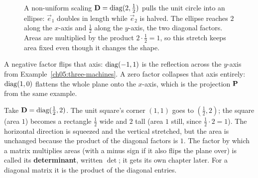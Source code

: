 \begin{figure}[H]
\centering
{}
\caption{A non-uniform scaling $\mathbf{D}=\operatorname{diag}(2,\tfrac12)$ pulls the unit circle
into an ellipse: $\vec{e}_1$ doubles in length while $\vec{e}_2$ is halved. The
ellipse reaches $2$ along the $x$-axis and $\tfrac12$ along the $y$-axis, the two
diagonal factors. Areas are multiplied by
the product $2\cdot\tfrac12 = 1$, so this stretch keeps area fixed even
though it changes the shape.}
\label{ch05:fig-scaling}
\end{figure}

A negative factor flips that axis: $\operatorname{diag}(-1,1)$ is the reflection across the
$y$-axis from Example~\ref{ch05:three-machines}. A zero factor collapses that axis
entirely: $\operatorname{diag}(1,0)$ flattens the whole plane onto the $x$-axis, which is the
projection $\mathbf{P}$ from the same example.

\begin{example}
\label{ch05:scaling-ex}
Take $\mathbf{D} = \operatorname{diag}(\tfrac12, 2)$. The unit square's corner $(1,1)$ goes to
$(\tfrac12, 2)$; the square (area $1$) becomes a rectangle $\tfrac12$ wide and $2$
tall (area $1$ still, since $\tfrac12 \cdot 2 = 1$). The horizontal direction is
squeezed and the vertical stretched, but the area is unchanged because the
product of the diagonal factors is $1$. The factor by which a matrix multiplies
areas (with a minus sign if it also flips the plane over) is called its
\textbf{determinant}, written $\det$; it gets its own chapter later. For a
diagonal matrix it is the product of the diagonal entries.
\end{example}


